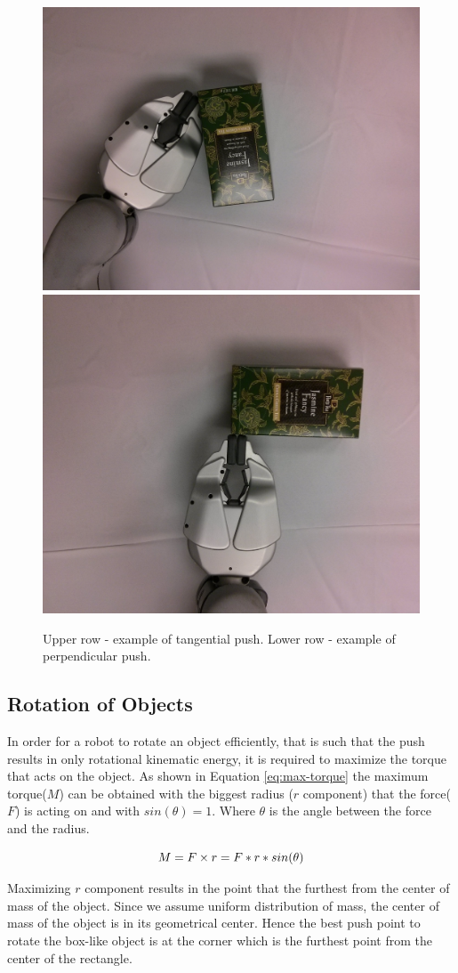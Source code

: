 \begin{figure}
\centering 

\includegraphics[width=0.4\columnwidth]{figures/peets-tangential.jpg}\\
\includegraphics[width=0.4\columnwidth]{figures/peets-perpendicular.jpg}\\


\caption{Upper row - example of tangential push. Lower row - example of perpendicular push.}
\label{fig:tangential-example}
\end{figure}


\subsection{Rotation of Objects}
In order for a robot to rotate an object efficiently, that is such that the push results in only rotational kinematic energy, it is required to maximize the torque that acts on the object. As shown in Equation \ref{eq:max-torque} the maximum torque($M$) can be obtained with the biggest radius ($r$ component) that the force($F$) is acting on and with $sin(\theta) = 1$. Where $\theta$ is the angle between the force and the radius.

\begin{equation}
M =  F \times r = F*r*sin(\theta)\\
\label{eq:max-torque}
\end{equation}

Maximizing $r$ component results in the point that the furthest from the center of mass of the object. Since we assume uniform distribution of mass, the center of mass of the object is in its geometrical center. Hence the best push point to rotate the box-like object is at the corner which is the furthest point from the center of the rectangle.

